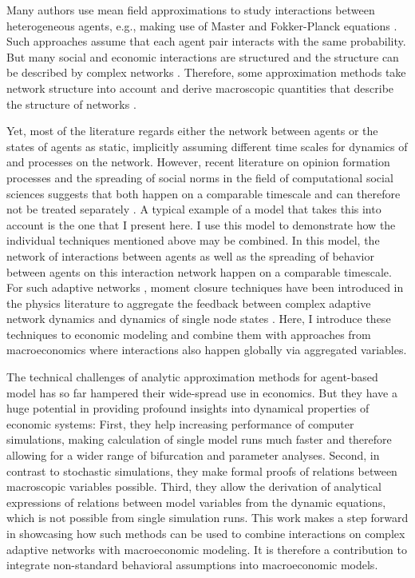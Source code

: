Many authors use mean field approximations to study interactions between heterogeneous agents, e.g., making use of Master and Fokker-Planck equations \citep{Aoki1998, Aoki2007, DelliGatti2000, DiGuilmi2008, Chiarella2011a, Landini2014}. Such approaches assume that each agent pair interacts with the same probability.
But many social and economic interactions are structured and the structure can be described by complex networks \citep{Friedkin2011}. Therefore, some approximation methods take network structure into account and derive macroscopic quantities that describe the structure of networks \citep[e.g.][]{Alfarano2008a, Lux2016}.

Yet, most of the literature regards either the network between agents or the states of agents as static, implicitly assuming different time scales for dynamics of and processes on the network.
However, recent literature on opinion formation processes and the spreading of social norms in the field of computational social sciences suggests that both happen on a comparable timescale and can therefore not be treated separately \citep{Gross2008, gross2009adaptive}.
A typical example of a model that takes this into account is the one that I present here. I use this model to demonstrate how the individual techniques mentioned above may be combined. In this model, the network of interactions between agents as well as the spreading of behavior between agents on this interaction network happen on a comparable timescale.
For such adaptive networks \citep{Gross2008}, moment closure techniques have been introduced in the physics literature to aggregate the feedback between complex adaptive network dynamics and dynamics of single node states \citep{Do2009, Demirel2014, Wiedermann2015, Min2017}.
Here, I introduce these techniques to economic modeling and combine them with approaches from macroeconomics where interactions also happen globally via aggregated variables.

The technical challenges of analytic approximation methods for agent-based model has so far hampered their wide-spread use in economics. But they have a huge potential in providing profound insights into dynamical properties of economic systems: First, they help increasing performance of computer simulations, making calculation of single model runs much faster and therefore allowing for a wider range of bifurcation and parameter analyses. Second, in contrast to stochastic simulations, they make formal proofs of relations between macroscopic variables possible. Third, they allow the derivation of analytical expressions of relations between model variables from the dynamic equations, which is not possible from single simulation runs. This work makes a step forward in showcasing how such methods can be used to combine interactions on complex adaptive networks with macroeconomic modeling. It is therefore a contribution to integrate non-standard behavioral assumptions into macroeconomic models.

